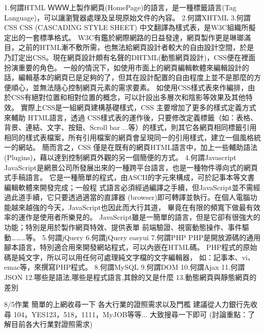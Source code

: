 1.何謂HTML
ＷＷＷ上製作網頁(HomePage)的語言，是一種標籤語言(Tag Language)，可以讓瀏覽器處理及呈現原始文件的內容。
2.何謂XHTML
3.何謂CSS
CSS (CASCADING STYLE SHEET) 中文翻譯為樣式表，是W3C組織所擬定出的一套標準格式。
W3C有鑑於網際網路的日益發達，網頁製作更是琳瑯滿目，之前的HTML漸不敷所需，也無法給網頁設計者較大的自由設計空間，於是乃訂定出CSS。現在網頁設計頗有名聲的DHTML(動態網頁設計)，CSS便在裡面扮演重要的角色。
一般的情況下，如使用市面上的網頁編輯軟體來編輯設計的話，編輯基本的網頁已是足夠的了，但其在設計配置的自由程度上並不是那麼的方便順心，並無法隨心控制網頁元素的需求要素。
如使用CSS樣式表來作編排，由於CSS有絕對位置和相對位置的概念，可以計設出多層次和陰影等效果及其他特效。 
實際上CSS是一組網頁建構基礎樣式，CSS 主要增加了更多的樣式定義方式來輔助 HTML語言，透過 CSS樣式表的運作後，只要修改定義標籤（如：表格、背景、連結、文字、按鈕、Scroll bar ...等）的樣式，則其它各網頁相同標籤引用相同的樣式表檔案，所有引用檔案的網頁會呈現同一的引用樣式，建立一個風格統一的網站。
簡而言之，CSS 僅是在既有的網頁HTML語言中，加上一些輔助語法(Plugins)，藉以達到控制網頁外觀的另一個簡便的方式。
4.何謂Javascript
JavaScript是網景公司所發展出來的一種跨平台語言，也是一種物件導向式的網頁式手稿語言。 
它是一種簡單的程式，由ASCII的字元來構成，可於記事本等文書編輯軟體來開發完成；一般程 式語言必須經過編譯之手續，但JavaScript並不需經過此道手續，它只要透過適當的直譯器 (browser)即可轉譯並執行。在個人電腦功能越來越強的今天，JavaScript也因此而大行其道， 畢竟在有限的頻寬下做最有效率的運作是使用者所樂見的。 
JavaScript雖是一簡單的語言，但是它卻有很強大的功能；特別是用於製作網頁特效、提供表單 前端驗證、視窗動態操作、事件驅動………等。 
5.何謂jQuery
6.何謂jQuery easyui
7.何謂PHP
PHP是開放源碼的通用腳本語言，特別適合用來開發網站程式，可以內嵌在HTML碼。
PHP程式的原始碼是純文字，所以可以用任何可處理純文字檔的文字編輯器，
如：記事本、vi、emac等，來撰寫PHP程式。
8.何謂MySQL
9.何謂DOM
10.何謂Ajax
11.何謂JSON
12.哪些是語法,哪些是程式語言,其餘的又是什麼
13.動態網頁與靜態網頁的差別

8/5作業
簡單的上網收尋一下
各大行業的證照需求以及門檻
建議從人力銀行先收尋
104，YES123，518，1111，MyJOB等等...
大致搜尋一下即可
(討論重點：了解目前各大行業對證照需求)

